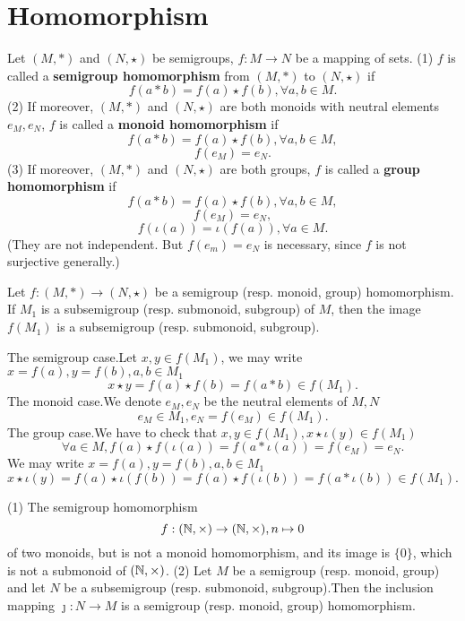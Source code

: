 \documentclass{book}
\numberwithin{equation}{section}
\begin{document}
\section{Homomorphism}
\begin{definitionenv}
    Let $(M, *)$ and $(N, \star)$ be  semigroups,  $f:M\rightarrow N$ be a mapping of sets.
    \newline
    (1) $f$ is called a \textbf{semigroup homomorphism} from $(M, *)$ to $(N, \star)$ if
    $$f(a*b)=f(a)\star f(b), \forall a, b\in M.$$
    (2) If moreover,  $(M, *)$ and $(N, \star)$ are both monoids with neutral elements $e_M, e_N$,  $f$ is called a \textbf{monoid homomorphism} if 
     $$f(a*b)=f(a)\star f(b), \forall a, b\in M, $$ 
     $$f(e_M)=e_N.$$
    (3) If moreover,  $(M, *)$ and $(N, \star)$ are both groups,  $f$ is called a \textbf{group homomorphism} if 
    $$f(a*b)=f(a)\star f(b), \forall a, b\in M, $$
    $$f(e_M)=e_N, $$
    $$f(\iota(a))=\iota(f(a)), \forall a\in M.$$
    (They are not independent. But $f(e_m)=e_N$ is necessary,  since $f$ is not surjective generally.)
\end{definitionenv}
\begin{propositionenv}
    \quad 
    \newline
    Let $f:(M, *)\rightarrow (N, \star)$ be a semigroup (resp. monoid, group) homomorphism. If $M_1$ is a subsemigroup (resp. submonoid, subgroup) of $M$,  then the image $f(M_1)$ is a subsemigroup (resp. submonoid, subgroup).
\end{propositionenv}
\begin{proofenv}
    The semigroup case.Let $x, y\in f(M_1)$,  we may write $x=f(a), y=f(b), a, b\in M_1$
    $$x\star y=f(a)\star f(b)=f(a*b)\in f(M_1).$$
    The monoid case.We denote $e_M, e_N$ be the neutral elements of $M, N$
    $$e_M\in M_1, e_N=f(e_M)\in f(M_1).$$
    The group case.We have to check that $x, y\in f(M_1), x\star \iota(y)\in f(M_1)$
    $$\forall a\in M,  f(a)\star f(\iota(a))=f(a*\iota(a))=f(e_M)=e_N.$$
    We may write $x=f(a), y=f(b), a, b\in M_1$
    $$x\star \iota(y)=f(a)\star\iota(f(b))=f(a)\star f(\iota(b))=f(a*\iota(b))\in f(M_1).$$
\end{proofenv}
\begin{remark}
    \quad
    \newline
    (1) The semigroup homomorphism
    $$f:(\mathbb{N}, \times)\rightarrow (\mathbb{N}, \times), n\mapsto 0$$
    of two monoids, but is not a monoid homomorphism, and its image is $\{0\}$,  which is not a submonoid of $(\mathbb{N}, \times)$.
    \newline
    (2) Let $M$ be a semigroup (resp. monoid, group) and let $N$ be a subsemigroup (resp. submonoid, subgroup).Then the inclusion mapping $\jmath :N\rightarrow M$ is a semigroup (resp. monoid,  group) homomorphism.
\end{remark}
\end{document}
